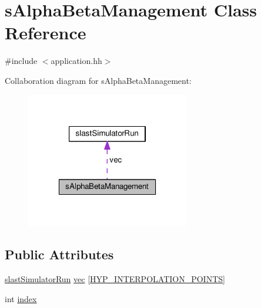 \hypertarget{classsAlphaBetaManagement}{\section{s\-Alpha\-Beta\-Management Class Reference}
\label{classsAlphaBetaManagement}
}


{\ttfamily \#include $<$application.\-hh$>$}



Collaboration diagram for s\-Alpha\-Beta\-Management\-:\nopagebreak
\begin{figure}[H]
\begin{center}
\leavevmode
\includegraphics[width=202pt]{classsAlphaBetaManagement__coll__graph}
\end{center}
\end{figure}
\subsection*{Public Attributes}
\begin{DoxyCompactItemize}
\item 
\hyperlink{classslastSimulatorRun}{slast\-Simulator\-Run} \hyperlink{classsAlphaBetaManagement_af9fd5945bd8e0566f69804372b5ca01d}{vec} \mbox{[}\hyperlink{application_8hh_a0f42c303bf81baaf28a6fa46e2b3e58e}{H\-Y\-P\-\_\-\-I\-N\-T\-E\-R\-P\-O\-L\-A\-T\-I\-O\-N\-\_\-\-P\-O\-I\-N\-T\-S}\mbox{]}
\item 
int \hyperlink{classsAlphaBetaManagement_acfd2318c63ee03cd1e25904deedfe88f}{index}
\end{DoxyCompactItemize}


